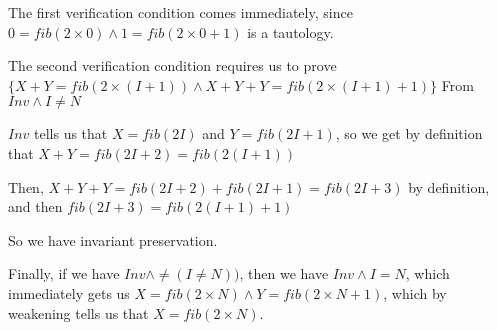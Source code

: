 \begin{enumerate}[label=(\alph*)]
          The first verification condition comes immediately, since $0 = fib(2 \times 0) \wedge 1 = fib(2 \times 0 + 1)$ is a tautology.

          The second verification condition requires us to prove $\{X + Y = fib(2 \times (I + 1)) \wedge X + Y + Y = fib(2 \times (I + 1) + 1)\}$ From $Inv \wedge I \neq N$

          $Inv$ tells us that $X = fib(2I)$ and $Y = fib(2I + 1)$, so we get by definition that $X + Y = fib(2I + 2) = fib(2(I + 1))$

          Then, $X + Y + Y = fib(2I+2) + fib(2I+1) = fib(2I+3)$ by definition, and then $fib(2I+3) = fib(2(I+1) + 1)$

          So we have invariant preservation.

        Finally, if we have $Inv \wedge \neq (I \neq N))$, then we have $Inv \wedge I = N$, which immediately gets us $X = fib(2 \times N) \wedge Y = fib(2 \times N + 1)$, which by weakening tells us that $X = fib(2 \times N)$.




        
    \end{enumerate}

